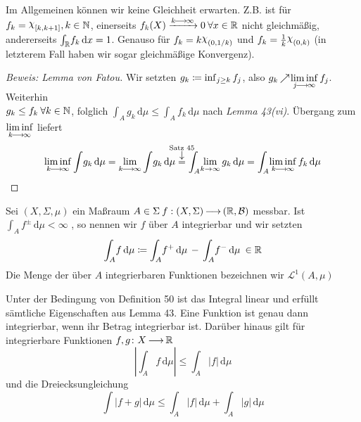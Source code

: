 \documentclass[skript.tex]{subfiles}
\begin{document}
		\begin{bem}
			Im Allgemeinen können wir keine Gleichheit erwarten. Z.B. ist für $f_k=\rchi_{[k,k+1]}, \\ k\in\N$, einerseits $f_k(X) \xrightarrow{k\kern -1pt \longrightarrow \kern -1pt\infty}0 \: \forall x\in\mathbb{R}$ nicht gleichmäßig, andererseits $\int_{\mathbb{R}} \! f_k \, \mathrm{d}x=1$. Genauso für $f_k=k\rchi_{(0, 1/k)}$ und $f_k=\frac{1}{k}\rchi_{(0,k)}$ (in letzterem Fall haben wir sogar gleichmäßige Konvergenz).
		\end{bem}
		\begin{proof}[Beweis: Lemma von Fatou]
			Wir setzten $g_k\coloneqq \inf_{j\geq k} f_j$, also $g_k\kern -1pt \nearrow \kern -2pt \liminf\limits_{j\kern -1pt \longrightarrow \kern -1pt\infty} f_j$. Weiterhin \\ $g_k\leq f_k \: \forall k\in\mathbb{N}$, folglich $\int_A \! g_k \, \mathrm{d}\mu\leq\int_A \! f_k \, \mathrm{d}\mu$ nach \textit{Lemma 43(vi)}. Übergang zum $\liminf\limits_{k\kern -1pt \longrightarrow \kern -1pt\infty}$ liefert
			\begin{equation*}
				\liminf_{k\lra\infty}\int \! g_k \, \mathrm{d}\mu= \lim\limits_{k\lra\infty} \int \! g_k \, \mathrm{d}\mu \darrow{\text{Satz 45}}{=} \int_A \! \lim_{k\to\infty} g_k \, \mathrm{d}\mu = \int_A \! \liminf\limits_{k\lra\infty} f_k \, \mathrm{d}\mu
			\end{equation*}
		\end{proof}

		\begin{defin}
			Sei $(X,\Sigma,\mu)$ ein Maßraum $A\in\Sigma \: f:(X,\Sigma) \kern -1pt \longrightarrow \kern -1pt (\mathbb{R},\mathcal{B})$ messbar. Ist $ \int_A \! f^\pm \, \mathrm{d}\mu<\infty$ , so nennen wir $f$ über $A$ integrierbar und wir setzten
			\begin{equation*}
				\int_A \! f \, \mathrm{d}\mu\coloneqq \int_A \! f^+ \, \mathrm{d}\mu \, - \, \int_A \! f^- \, \mathrm{d}\mu \: \in\mathbb{R}
			\end{equation*}
			Die Menge der über $A$ integrierbaren Funktionen bezeichnen wir $\mathscr{L}^1(A,\mu)$
		\end{defin}
		\begin{lem}
			Unter der Bedingung von \textup{Definition 50} ist das Integral linear und erfüllt sämtliche Eigenschaften aus \textup{Lemma 43}. Eine Funktion ist genau dann integrierbar, wenn ihr Betrag integrierbar ist. Darüber hinaus gilt für integrierbare Funktionen $f,g\colon X\kern -1pt \longrightarrow \kern -1pt\mathbb{R}$
			\begin{equation*}
				\left\vert \int_A \! f \, \mathrm{d}\mu\right\vert \leq \int_A \! |f| \, \mathrm{d}\mu
			\end{equation*}
			und die Dreiecksungleichung
			\begin{equation*}
				\int \! |f+g| \, \mathrm{d}\mu \leq \int_A \! |f| \, \mathrm{d}\mu + \int_A \! |g| \, \mathrm{d}\mu
			\end{equation*}
			\end{lem}
\end{document}

